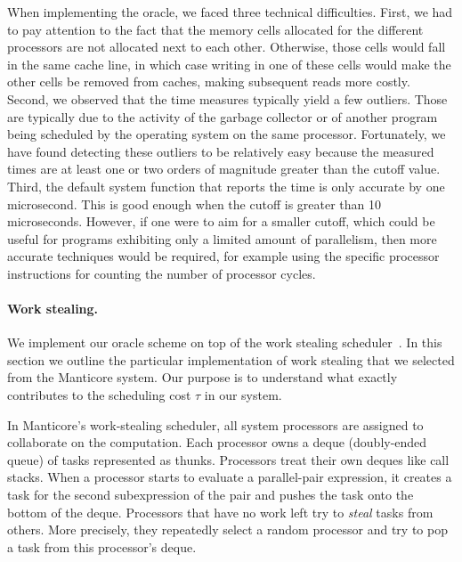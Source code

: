 When implementing the oracle, we faced three technical difficulties.
First, we had to pay attention to the fact that the memory cells
allocated for the different processors are not allocated next to each
other. Otherwise, those cells would fall in the same cache line, in
which case writing in one of these cells would make the other cells be
removed from caches, making subsequent reads more costly.  Second, we
observed that the time measures typically yield a few outliers.  Those
are typically due to the activity of the garbage collector or of
another program being scheduled by the operating system on the same
processor.  Fortunately, we have found detecting these outliers to be
relatively easy because the measured times are at least one or two
orders of magnitude greater than the cutoff value.  Third, the default
system function that reports the time is only accurate by one
microsecond. This is good enough when the cutoff is greater than 10
microseconds.  However, if one were to aim for a smaller cutoff, which
could be useful for programs exhibiting only a limited amount of
parallelism, then more accurate techniques would be required, for
example using the specific processor instructions for counting the
number of processor cycles.

\paragraph{Work stealing.}

We implement our oracle scheme on top of the work stealing
scheduler~\cite{BlumofeWorkStealing}. In this section we outline the
particular implementation of work stealing that we selected from the
Manticore system. Our purpose is to understand what exactly
contributes to the scheduling cost $\tau$ in our system.

In Manticore's work-stealing scheduler, all system processors are
assigned to collaborate on the computation. Each processor owns a
deque (doubly-ended queue) of tasks represented as thunks. Processors
treat their own deques like call stacks.  When a processor starts to
evaluate a parallel-pair expression, it creates a task for the second
subexpression of the pair and pushes the task onto the bottom of the
deque. Processors that have no work left try to 
{\em steal} tasks from others. More precisely, they repeatedly select 
a random processor and try to pop a task from this processor's deque. 

